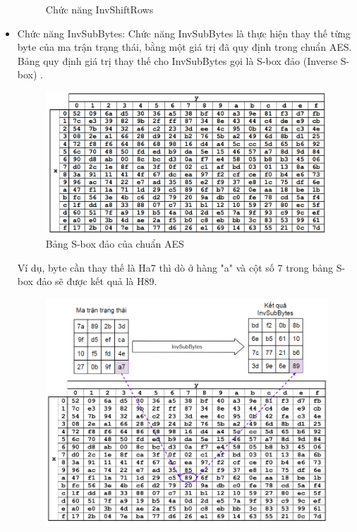 \begin{itemize}
\begin{figure}[H]
    
    \caption{Chức năng InvShiftRows}
\end{figure}
\item Chức năng InvSubBytes:
Chức năng InvSubBytes là thực hiện thay thế từng byte của ma trận trạng thái, bằng một giá trị đã quy định trong chuẩn AES. Bảng quy định giá trị thay thế cho InvSubBytes gọi là S-box đảo (Inverse S-box) \cite{fips2001197}.
\begin{figure}[H]
    \centering
    \includegraphics[scale=0.3]{pic/huê/bảng S-box Inv.png}
    
    \caption{Bảng S-box đảo của chuẩn AES}
\end{figure}
Ví dụ, byte cần thay thế là Ha7 thì dò ở hàng "a" và cột số 7 trong bảng S-box đảo sẽ được kết quả là H89.
\begin{figure}[H]
    \centering
    \includegraphics[scale=0.5]{pic/huê/Chức năng InvSubBytes.png}
    

\end{figure}
\end{itemize}
